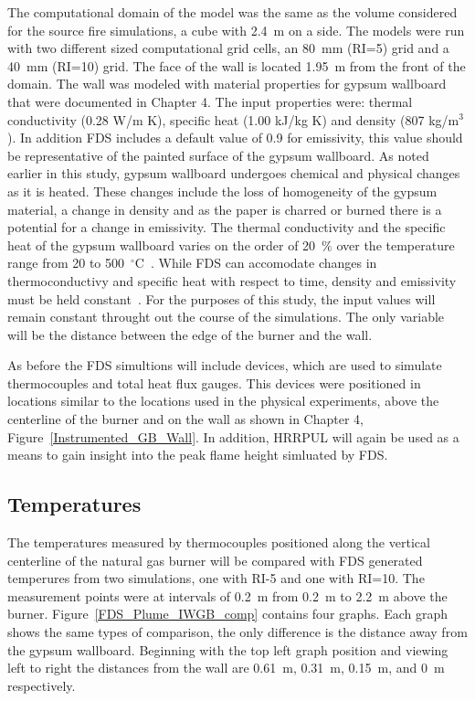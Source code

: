 \documentclass[twoside]{uocthesis}
\begin{document}
{The computational domain of the model was the same as the volume considered for the source fire simulations, a cube with 2.4~m on a side. The models were run with two different sized computational grid cells, an 80~mm (RI=5) grid and a 40~mm (RI=10) grid.  The face of the wall is located 1.95~m from the front of the domain.  
The wall was modeled with material properties for gypsum wallboard that were documented in Chapter 4.  The input properties were: thermal conductivity (0.28 W/m K), specific heat (1.00 kJ/kg K) and density (807 kg/m$^3$).  In addition FDS includes a default value of 0.9 for emissivity, this value should be representative of the painted surface of the gypsum wallboard. As noted earlier in this study, gypsum wallboard undergoes chemical and physical changes as it is heated.  These changes include the loss of homogeneity of the gypsum material, a change in density and as the paper is charred or burned there is a potential for a change in emissivity.  The thermal conductivity and the specific heat of the gypsum wallboard varies on the order of 20~$\%$ over the temperature range from 20 to 500~$^\circ$C~\cite{Gross:1985}.  While FDS can accomodate changes in thermoconductivy and specific heat with respect to time, density and emissivity must be held constant~\cite{FDS_Users_Guide}.  For the purposes of this study, the input values will remain constant throught out the course of the simulations.  The only variable will be the distance between the edge of the burner and the wall.

As before the FDS simultions will include devices, which are used to simulate thermocouples and total heat flux gauges.  This devices were positioned in locations similar to the locations used in the physical experiments, above the centerline of the burner and on the wall as shown in Chapter 4, Figure~\ref{Instrumented_GB_Wall}. In addition, HRRPUL will again be used as a means to gain insight into the peak flame height simluated by FDS.  

\subsection{Temperatures}

 The temperatures measured by thermocouples positioned along the vertical centerline of the natural gas burner will be compared with FDS generated temperures from two simulations, one with RI-5 and one with RI=10.  The measurement points were at intervals of 0.2~m from 0.2~m to 2.2~m above the burner.  Figure~\ref{FDS_Plume_IWGB_comp} contains four graphs.  Each graph shows the same types of comparison, the only difference is the distance away from the gypsum wallboard.  Beginning with the top left graph position and viewing left to right the distances from the wall are 0.61~m, 0.31~m, 0.15~m, and 0~m respectively.  

}
\end{document}
